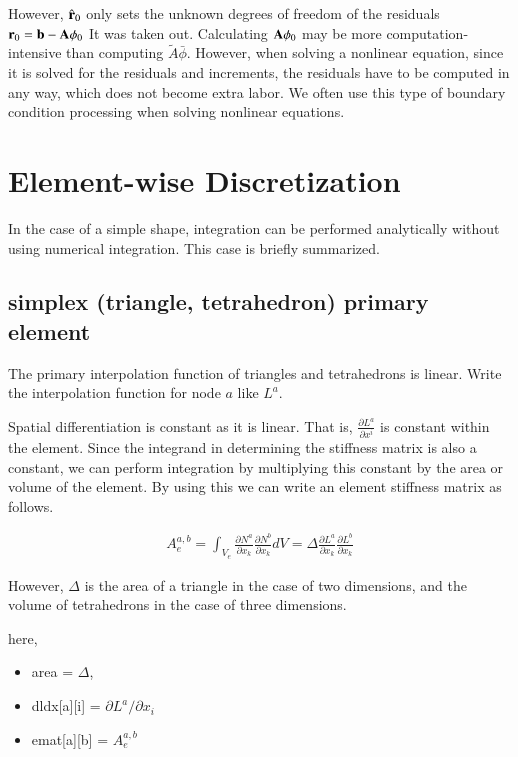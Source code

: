 However, $\hat{\mathbf{r}}_0$ only sets the unknown degrees of freedom of the residuals $\mathbf{r}_0=\mathbf{b} - \mathbf{A}\mathbf{\phi}_0$ It was taken out.
%
Calculating $\mathbf{A}\mathbf{\phi}_0$ may be more computation-intensive than computing $ \tilde{A}\bar{\phi}$.
%
However, when solving a nonlinear equation, since it is solved for the residuals and increments, the residuals have to be computed in any way, which does not become extra labor.
%
We often use this type of boundary condition processing when solving nonlinear equations.

\section{Element-wise Discretization}

In the case of a simple shape, integration can be performed analytically without using numerical integration. This case is briefly summarized.

\subsection{simplex (triangle, tetrahedron) primary element}

The primary interpolation function of triangles and tetrahedrons is linear. Write the interpolation function for node $a$ like $L^a$.

Spatial differentiation is constant as it is linear. That is, $\frac{\partial L^a}{\partial x^i}$ is constant within the element. Since the integrand in determining the stiffness matrix is ​​also a constant, we can perform integration by multiplying this constant by the area or volume of the element. By using this we can write an element stiffness matrix as follows.

\begin{eqnarray}
A_e^{a,b}=\int_{V_e}\frac{\partial N^a}{\partial x_k}\frac{\partial N^b}{\partial x_k}dV=\Delta\frac{\partial L^a}{\partial x_k}\frac{\partial L^b}{\partial x_k}
\end{eqnarray}


However, $\Delta$ is the area of ​​a triangle in the case of two dimensions, and the volume of tetrahedrons in the case of three dimensions.


here,

\begin {itemize}
\item area = $\Delta$,
\item dldx[a][i] = $\partial L^a / \partial x_i$
\item emat[a][b] = $A_e^{a,b}$
\end {itemize}

